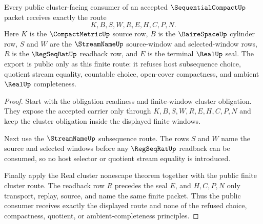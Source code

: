 \begin{theorem}
\label{thm:sequentialcompact-public-cluster-export}
Every public cluster-facing consumer of an accepted $\SequentialCompactUp$ packet receives exactly the route
$$
K,B,S,W,R,E,H,C,P,N .
$$
Here $K$ is the $\CompactMetricUp$ source row, $B$ is the $\BaireSpaceUp$ cylinder row, $S$ and $W$ are the $\StreamNameUp$ source-window and selected-window rows, $R$ is the $\RegSeqRatUp$ readback row, and $E$ is the terminal $\RealUp$ seal. The export is public only as this finite route: it refuses host subsequence choice, quotient stream equality, countable choice, open-cover compactness, and ambient $\RealUp$ completeness.
\end{theorem}
\begin{proof}
Start with the obligation readiness and finite-window cluster obligation. They expose the accepted carrier only through $K,B,S,W,R,E,H,C,P,N$ and keep the cluster obligation inside the displayed finite windows.

Next use the $\StreamNameUp$ subsequence route. The rows $S$ and $W$ name the source and selected windows before any $\RegSeqRatUp$ readback can be consumed, so no host selector or quotient stream equality is introduced.

Finally apply the Real cluster nonescape theorem together with the public finite cluster route. The readback row $R$ precedes the seal $E$, and $H,C,P,N$ only transport, replay, source, and name the same finite packet. Thus the public consumer receives exactly the displayed route and none of the refused choice, compactness, quotient, or ambient-completeness principles.
\end{proof}

